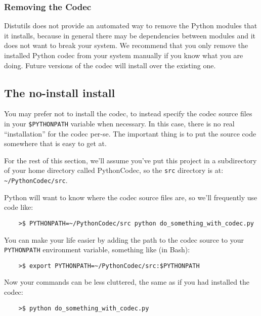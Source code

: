 \documentclass[11pt]{article}
\begin{document}
\subsubsection{Removing the Codec}
Distutils does not provide an automated way to remove the Python modules that it installs, because in general there may be dependencies between modules and it does not want to break your system. We recommend that you only remove the installed Python codec from your system manually if you know what you are doing.  Future versions of the codec will install over the existing one.



\subsection{The no-install install}
You may prefer not to install the codec, to instead specify the codec source files in your \texttt{\$PYTHONPATH} variable when necessary.  In this case, there is no real ``installation'' for the codec per-se.  The important thing is to put the source code somewhere that is easy to get at.

For the rest of this section, we'll assume you've put this project in a subdirectory of your home directory called PythonCodec, 
so the \texttt{src} directory is at: \texttt{\~{}/PythonCodec/src}.

Python will want to know where the codec source files are, so we'll frequently use code like:
\begin{verbatim}
	>$ PYTHONPATH=~/PythonCodec/src python do_something_with_codec.py
\end{verbatim}

You can make your life easier by adding the path to the codec source to your \texttt{PYTHONPATH} environment variable, something like (in Bash):
\begin{verbatim}
	>$ export PYTHONPATH=~/PythonCodec/src:$PYTHONPATH
\end{verbatim}

Now your commands can be less cluttered, the same as if you had installed the codec:
\begin{verbatim}
	>$ python do_something_with_codec.py
\end{verbatim}
\end{document}
